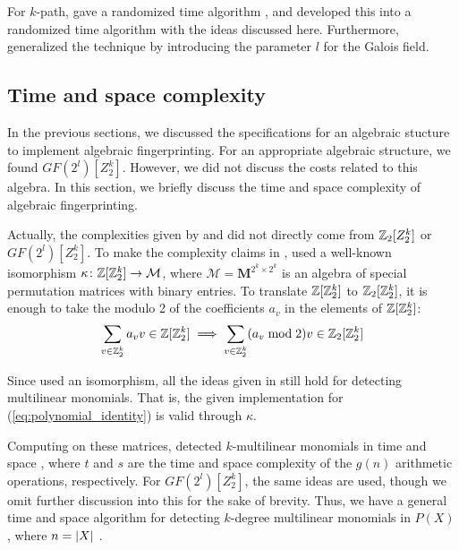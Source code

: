 For $k$-path, \citeauthor{Koutis08} 
gave a randomized  time algorithm \cite{Koutis08}, 
and \citeauthor{Williams09} developed this into a randomized  
time algorithm \cite{Williams09} with the ideas discussed here. 
Furthermore, \citeauthor{Williams09} 
generalized the technique by introducing the parameter $l$ for the Galois field.

\subsection{Time and space complexity}
\label{sect:complexity}

In the previous sections, we discussed the specifications 
for an algebraic stucture to implement algebraic fingerprinting. 
For an appropriate algebraic structure, we found $GF(2^{l})[Z_2^k]$. 
However, we did not discuss the costs related 
to this algebra. In this section, we briefly discuss the time and space complexity 
of algebraic fingerprinting.
%

Actually, the complexities given by \textcite{Koutis08} and 
\textcite{Williams09} did not directly come from 
$\mathbb Z_2[Z_2^k]$ or $GF(2^{l})[Z_2^k]$. 
To make the complexity claims in \cite{Koutis08}, 
\citeauthor{Koutis08} used a well-known \cite{Terras99} isomorphism 
$\kappa \colon \mathbb Z[\mathbb Z_2^k] \to \mathcal{M}$, where $\mathcal{M} = \mathbf{M}^{2^k \times 2^k}$ 
is an algebra of special permutation matrices with binary entries. To translate $\mathbb Z[\mathbb Z_2^k]$ to 
$\mathbb Z_2[\mathbb Z_2^k]$, it is enough to take the modulo 2 of the coefficients $a_v$ in 
the elements of $\mathbb Z[\mathbb Z_2^k]$: 
\[
  \sum_{v \in \mathbb Z_2^k}a_v v \in \mathbb Z[\mathbb Z_2^k] \implies 
  \sum_{v \in \mathbb Z_2^k}(a_v \bmod 2) v \in \mathbb Z_2[\mathbb Z_2^k]
\]

Since \citeauthor{Koutis08} 
used an isomorphism, all the ideas given in 
 still hold for 
detecting multilinear monomials. That is, 
the given implementation for (\ref{eq:polynomial_identity}) 
is valid through $\kappa$.

Computing on these matrices, 
\textcite{Koutis08} detected $k$-multilinear monomials  
in time  and space , where $t$ and $s$ are the time 
and space complexity of the $g(n)$ arithmetic operations, respectively. 
For $GF(2^{l})[Z_2^k]$, the same ideas are used, though we omit 
further discussion into this for the sake of brevity. 
Thus, we have a general 
 time and  space algorithm for detecting 
$k$-degree multilinear monomials in $P(X)$, where $n = {\left\vert X\right\vert}$ \cite{KouWil09}.


